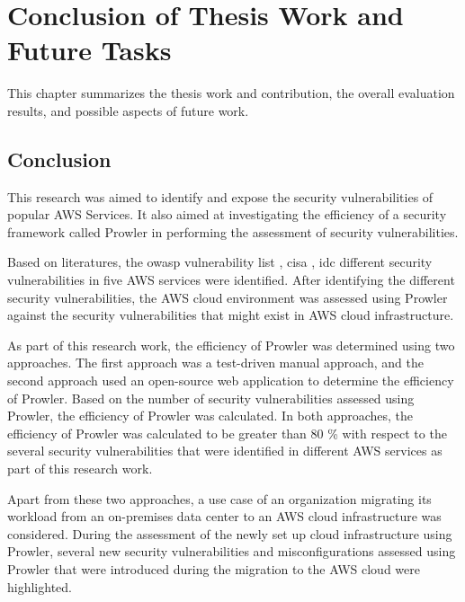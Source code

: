 
\chapter{Conclusion of Thesis Work and Future Tasks}

\par This chapter summarizes the thesis work and contribution, the overall evaluation results, and possible aspects of future work.

\section{Conclusion}

\par This research was aimed to identify and expose the security vulnerabilities of popular AWS Services.
It also aimed at investigating the efficiency of a security framework called Prowler in performing the assessment of security vulnerabilities.


\par Based on literatures, the \gls{owasp} vulnerability list \cite{51}, \gls{cisa} \cite{52}, \gls{idc} \cite{53} different security vulnerabilities in five AWS services were identified.
After identifying the different security vulnerabilities,
the AWS cloud environment was assessed using Prowler
against the security vulnerabilities that might exist in
AWS cloud infrastructure.


\par As part of this research work, the efficiency of Prowler was determined using two approaches.
The first approach was a test-driven manual approach, and the second approach used an open-source web application to determine the efficiency of Prowler.
Based on the number of security vulnerabilities assessed using Prowler, the efficiency of Prowler was calculated.
In both approaches, the efficiency of Prowler was
calculated to be greater than 80 \% with respect to the
several
security vulnerabilities that were identified in
different AWS services as part of
this research work.


\par Apart from these two approaches, a use case of
an organization migrating its workload from an on-premises data center to an AWS cloud infrastructure was considered.
During the assessment of the newly set up cloud infrastructure using Prowler, several new security vulnerabilities and misconfigurations assessed using Prowler that were introduced during the migration to the AWS cloud were highlighted.

